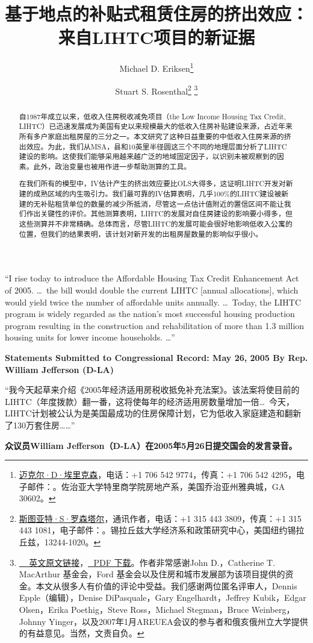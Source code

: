 \documentclass[lang=cn,11pt,a4paper]{paper}
\title{基于地点的补贴式租赁住房的挤出效应：来自LIHTC项目的新证据}
\author{Michael D. Eriksen\thanks{\href{http://www.eriksen.myweb.uga.edu}{迈克尔·D·埃里克森}，电话：+1 706 542 9774，传真：+1 706 542 4295，电子邮件：\email{eriksen@terry.uga.edu}。佐治亚大学特里商学院房地产系，美国乔治亚州雅典城，GA 30602。} \and Stuart S. Rosenthal\thanks{\href{http://www.faculty.maxwell.syr.edu/rosenthal}{斯图亚特·S·罗森塔尔}，通讯作者，电话：+1 315 443 3809，传真：+1 315 443 1081，电子邮件：\email{ssrosent@maxwell.syr.edu}。锡拉丘兹大学经济系和政策研究中心，美国纽约锡拉丘兹，13244-1020。}\; \thanks{\href{https://www.sciencedirect.com/science/article/pii/S0047272710000885}{~\faLink\,~英文原文链接}，\href{https://sci-hub.tw/10.1016/j.jpubeco.2010.07.002}{\faFilePdfO\,~PDF 下载}。作者非常感谢John D.，Catherine T. MacArthur 基金会，Ford 基金会以及住房和城市发展部为该项目提供的资金。本文从很多人有价值的评论中受益。我们感谢两位匿名评审人，Dennis Epple（编辑），Denise DiPasquale，Gary Engelhardt，Jeffrey Kubik，Edgar Olsen，Erika Poethig，Steve Ross，Michael Stegman，Bruce Weinberg，Johnny Yinger，以及2007年1月AREUEA会议的参与者和俄亥俄州立大学提供的有益意见。当然，文责自负。}}
\date{\zhtoday}
\begin{document}
\maketitle

\begin{abstract}
  \hspace{2\ccwd}自1987年成立以来，低收入住房税收减免项目（the Low Income Housing Tax Credit, LIHTC）已迅速发展成为美国有史以来规模最大的低收入住房补贴建设来源，占近年来所有多户家庭出租房屋的三分之一。本文研究了这种日益重要的中低收入住房来源的挤出效应。为此，我们从MSA，县和10英里半径圆这三个不同的地理层面分析了LIHTC建设的影响。这使我们能够采用越来越广泛的地域固定因子，以识别未被观察到的因素。此外，政治变量也被用作进一步帮助测算的工具。
  
  \!在我们所有的模型中，IV估计产生的挤出效应要比OLS大得多，这证明LIHTC开发对新建的成熟区域的内生吸引力。我们最可靠的IV估算表明，几乎100\%的LIHTC建设被新建的无补贴租赁单位的数量的减少所抵消，尽管这一点估计值附近的置信区间不能让我们作出关键性的评价。其他测算表明，LIHTC的发展对自住房建设的影响要小得多，但这些测算并不非常精确。总体而言，尽管LIHTC的发展可能会很好地影响低收入公寓的位置，但我们的结果表明，该计划对新开发的出租房屋数量的影响似乎很小。

\end{abstract}
\vspace{10pt}

\begin{tcolorbox}[
	colback=yellow!10!white,
  colframe=red!30!black,
  fontupper = \itshape,
]
“I rise today to introduce the Affordable Housing Tax Credit Enhancement Act of 2005. \dots~the bill would double the current LIHTC [annual allocations], which would yield twice the number of affordable units annually. \dots~Today, the LIHTC program is widely regarded as the nation's most successful housing production program resulting in the construction and rehabilitation of more than 1.3 million housing units for lower income households. \dots”
\vspace{5pt}

\textbf{Statements Submitted to Congressional Record: May 26, 2005 By Rep. William Jefferson (D-LA)}

\tcblower

“我今天起草来介绍《2005年经济适用房税收抵免补充法案》。该法案将使目前的LIHTC（年度拨款）翻一番，这将使每年的经济适用房数量增加一倍\dots~今天，LIHTC计划被公认为是美国最成功的住房保障计划，它为低收入家庭建造和翻新了130万套住房\dots\dots”
\vspace{5pt}

\textbf{众议员William Jefferson（D-LA）在2005年5月26日提交国会的发言录音。}

\end{tcolorbox}
\vspace{10pt}
\end{document}
